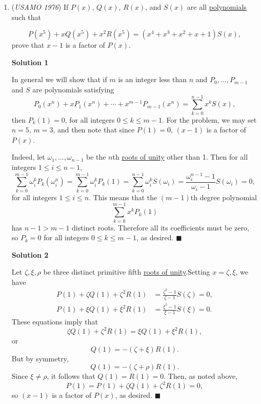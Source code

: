 \begin{enumerate}
 


 
<i>Alternate solutions are always welcome. If you have a different, elegant solution to this problem, please \href{https://artofproblemsolving.com/wiki/index.php?title=1976\_USAMO\_Problems/Problem\_4&action=edit}{add it} to this page.</i>



	\item (\textit{USAMO 1976}) If $P(x)$, $Q(x)$, $R(x)$, and $S(x)$ are all \href{https://artofproblemsolving.com/wiki/index.php?title=Polynomial}{polynomials} such that

 \[P(x^5) + xQ(x^5) + x^2 R(x^5) = (x^4 + x^3 + x^2 + x +1) S(x),\]
prove that $x-1$ is a factor of $P(x)$.


 



\textbf{Solution 1}

In general we will show that if $m$ is an integer less than $n$ and $P_0, \dotsc, P_{m-1}$ and $S$ are polynomials satisfying
 \[P_0(x^n) + x P_1(x^n) + \dotsb + x^{m-1} P_{m-1}(x^n) = \sum_{k=0}^{n-1} x^k S(x),\]then $P_k(1) = 0$, for all integers $0 \le k \le m-1$.  For the problem, we may set $n=5$, $m=3$, and then note that since $P(1)= 0$, $(x-1)$ is a factor of $P(x)$.

 Indeed, let $\omega_1, \dotsc, \omega_{n-1}$ be the $n$th \href{https://artofproblemsolving.com/wiki/index.php?title=Roots\_of\_unity}{roots of unity} other than 1.  Then for all integers $1 \le i \le n-1$,
 \[\sum_{k=0}^{m-1} \omega_i^k P_k(\omega_i^n) = \sum_{k=0}^{m-1} \omega_i^k P_k(1) = \sum_{k=0}^{n-1} \omega_i^k S(\omega_i) = \frac{\omega_i^{n-1} - 1}{\omega_i - 1} S(\omega_i) = 0 ,\]for all integers $1 \le i \le n$.  This means that the $(m-1)$th degree polynomial
 \[\sum_{k=0}^{m-1} x^k P_k(1)\]has $n-1 > m-1$ distinct roots.  Therefore all its coefficients must be zero, so $P_k = 0$ for all integers $0 \le k \le m-1$, as desired.  $\blacksquare$




\textbf{Solution 2}

Let $\zeta, \xi, \rho$ be three distinct primitive fifth \href{https://artofproblemsolving.com/wiki/index.php?title=Roots\_of\_unity}{roots of unity}.Setting $x = \zeta, \xi$, we have
 \begin{align*} P(1) + \zeta Q(1) + \zeta^2 R(1) &= \frac{\zeta^5-1}{\zeta-1} S(\zeta) = 0, \\ P(1) + \xi Q(1) + \xi^2 R(1) &= \frac{\xi^5-1}{\xi-1} S(\xi) = 0 . \end{align*}
These equations imply that
 \[\zeta Q(1) + \zeta^2 R(1) = \xi Q(1) + \xi^2 R(1),\]or
 \[Q(1) = - ( \zeta + \xi)R(1).\]But by symmetry,
 \[Q(1) = - (\zeta + \rho)R(1) .\]Since $\xi \neq \rho$, it follows that $Q(1) = R(1) = 0$.  Then, as noted above,
 \[P(1) = P(1) + \zeta Q(1) + \zeta^2 R(1) = 0,\]so $(x-1)$ is a factor of $P(x)$, as desired.  $\blacksquare$





\end{enumerate}
